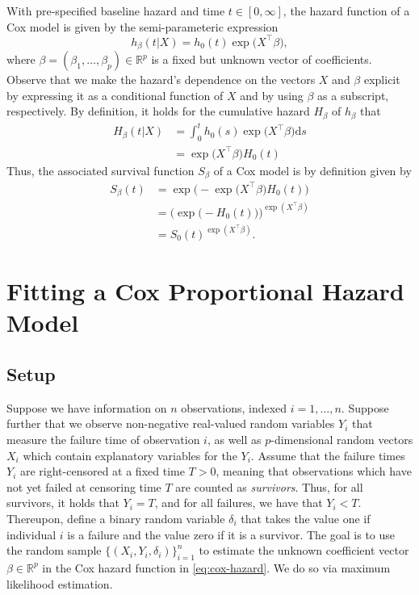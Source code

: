 \documentclass[11pt]{article}
\newcommand{\R}{\mathbb{R}}
\renewcommand{\d}{\text{d}}
\begin{document}
With pre-specified baseline hazard and time $t \in[0,\infty]$, the hazard function of a Cox model is given by the semi-parameteric expression
\begin{equation}\label{eq:cox-hazard}
    h_\beta(t | X) = h_0(t) \exp \big( X^\top \beta \big),
\end{equation}
where $\beta = (\beta_1,\dots,\beta_p)\in\R^p$ is a fixed but unknown vector of coefficients. Observe that we make the hazard's dependence on the vectors $X$ and $\beta$ explicit by expressing it as a conditional function of $X$ and by using $\beta$ as a subscript, respectively. By definition, it holds for the cumulative hazard $H_\beta$ of $h_\beta$ that
\begin{equation*}
\begin{split}
    H_\beta(t|X) &= \int^t_0 h_0(s) \exp \big(X^\top \beta \big) \d s
    \\
    &= \exp \big(X^\top \beta \big) H_0(t)
\end{split}
\end{equation*}
Thus, the associated survival function $S_\beta$ of a Cox model is by definition given by
\begin{equation} \label{eq:cox-survival}
\begin{split}
    S_\beta(t) 
    &=
    \exp\Big( - \exp\big( X^\top \beta \big) H_0(t)  \Big)
    \\&=
    \Big(\exp\big( - H_0(t) \big) \Big)^{\exp(X^\top \beta)}
    \\&=
    S_0(t)^{\exp(X^\top \beta)}.
\end{split}
\end{equation}

\section{Fitting a Cox Proportional Hazard Model}
\subsection{Setup}
Suppose we have information on $n$ observations, indexed $i=1,\dots,n$. Suppose further that we observe non-negative real-valued random variables $Y_i$ that measure the failure time of observation $i$, as well as $p$-dimensional random vectors $X_i$ which contain explanatory variables for the $Y_i$. Assume that the failure times $Y_i$ are right-censored at a fixed time $T>0$, meaning that observations which have not yet failed at censoring time $T$ are counted as \textit{survivors}. Thus, for all survivors, it holds that $Y_i = T$, and for all failures, we have that $Y_i < T$. Thereupon, define a binary random variable $\delta_i$ that takes the value one if individual $i$ is a failure and the value zero if it is a survivor. The goal is to use the random sample $\big\{ (X_i, Y_i, \delta_i) \big\}_{i=1}^n$ to estimate the unknown coefficient vector $\beta\in\R^p$ in the Cox hazard function in \eqref{eq:cox-hazard}. We do so via maximum likelihood estimation. 
\end{document}

